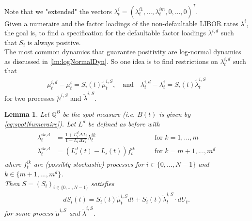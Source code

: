 \documentclass[12pt]{article}
\newtheorem{lemma}[theorem]{Lemma}
\begin{document}
	Note that we "extended" the vectors $\lambda^{i}_t = (\lambda^{i 1}_t, ..., \lambda^{i m}_t, 0, ..., 0)^T$.\\
	Given a numeraire and the factor loadings of the non-defaultable LIBOR rates $\lambda^i$, the goal is, to find a specification for the defaultable factor loadings $\lambda^{i,d}$ such that $S_i$ is always positive.\\
	The most common dynamics that guarantee positivity are log-normal dynamics as discussed in \cref{lm:logNormalDyn}. So one idea is to find restrictions on $\lambda^{i,d}_t$ such that 
	\begin{align*}
		\mu^{i,d}_t - \mu^{i}_t = S_i(t)\tilde{\mu}^{i,S}_t, \quad \text{and} 
		\quad \lambda^{i,d}_t - \lambda^{i}_t = S_i(t)\tilde{\lambda}^{i,S}_t
	\end{align*}
	for two processes $\tilde{\mu}^{i,S}$ and $\tilde{\lambda}^{i,S}$.
	\begin{lemma}\label{lem:flguaranteeingpositivespreads}
		Let $\mathbb{Q}^B$ be the spot measure (i.e. $B(t)$ is given by \cref{eq:spotNumeraire}).
		Let $L^d$ be defined as before with 
		\begin{align}
			\begin{aligned}
				\lambda^{i k,d}_t &= \frac{1+L^d_i\Delta T_i}{1+L_i\Delta T_i} \lambda^{i k}_t \quad \quad & \text{for } k= 1,...,m\\
				\lambda^{i k,d}_t &= \left(L^d_i(t) - L_i(t)\right)f^{i k}_t \quad \quad & \text{for } k= m+1, ..., m^d
			\end{aligned}
		\end{align}
		where $f^{i k}_t$ are (possibly stochastic) processes for $i\in\{0, ..., N-1\}$ and $k\in \{m+1, ..., m^d\}$.\\
		Then $S = (S_i)_{i\in \{0, ..., N-1\}}$ satisfies 
		\begin{align*}
			dS_i(t) = S_i(t)\tilde{\mu}^{i,S}_t dt + S_i(t)\tilde{\lambda}^{i,S}_t \cdot dU_t.
		\end{align*}
		for some process $\tilde{\mu}^{i,S}$ and $\tilde{\lambda}^{i,S}$.
	\end{lemma}
\end{document}
